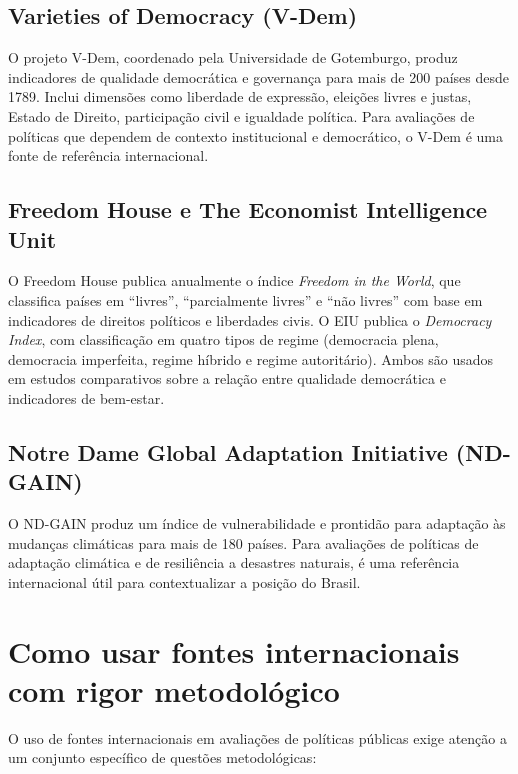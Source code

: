 \subsection{Varieties of Democracy (V-Dem)}

O projeto V-Dem, coordenado pela Universidade de Gotemburgo, produz indicadores de qualidade democrática e governança para mais de 200 países desde 1789. Inclui dimensões como liberdade de expressão, eleições livres e justas, Estado de Direito, participação civil e igualdade política. Para avaliações de políticas que dependem de contexto institucional e democrático, o V-Dem é uma fonte de referência internacional.

\subsection{Freedom House e The Economist Intelligence Unit}

O Freedom House publica anualmente o índice \textit{Freedom in the World}, que classifica países em ``livres'', ``parcialmente livres'' e ``não livres'' com base em indicadores de direitos políticos e liberdades civis. O EIU publica o \textit{Democracy Index}, com classificação em quatro tipos de regime (democracia plena, democracia imperfeita, regime híbrido e regime autoritário). Ambos são usados em estudos comparativos sobre a relação entre qualidade democrática e indicadores de bem-estar.

\subsection{Notre Dame Global Adaptation Initiative (ND-GAIN)}

O ND-GAIN produz um índice de vulnerabilidade e prontidão para adaptação às mudanças climáticas para mais de 180 países. Para avaliações de políticas de adaptação climática e de resiliência a desastres naturais, é uma referência internacional útil para contextualizar a posição do Brasil.

\section{Como usar fontes internacionais com rigor metodológico}

O uso de fontes internacionais em avaliações de políticas públicas exige atenção a um conjunto específico de questões metodológicas:

